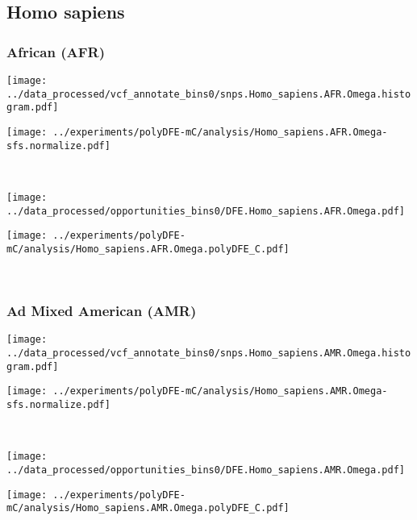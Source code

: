 \subsection{Homo sapiens}

\subsubsection{African (AFR)}

\begin{minipage}{0.49\linewidth}
    \texttt{[image: ../data\_processed/vcf\_annotate\_bins0/snps.Homo\_sapiens.AFR.Omega.histogram.pdf]}
\end{minipage}
\begin{minipage}{0.49\linewidth}
    \texttt{[image: ../experiments/polyDFE-mC/analysis/Homo\_sapiens.AFR.Omega-sfs.normalize.pdf]}
\end{minipage}
\\
\begin{minipage}{0.49\linewidth}
    \texttt{[image: ../data\_processed/opportunities\_bins0/DFE.Homo\_sapiens.AFR.Omega.pdf]}
\end{minipage}
\begin{minipage}{0.49\linewidth}
    \texttt{[image: ../experiments/polyDFE-mC/analysis/Homo\_sapiens.AFR.Omega.polyDFE\_C.pdf]}
\end{minipage}
\\

\subsubsection{Ad Mixed American (AMR)}

\begin{minipage}{0.49\linewidth}
    \texttt{[image: ../data\_processed/vcf\_annotate\_bins0/snps.Homo\_sapiens.AMR.Omega.histogram.pdf]}
\end{minipage}
\begin{minipage}{0.49\linewidth}
    \texttt{[image: ../experiments/polyDFE-mC/analysis/Homo\_sapiens.AMR.Omega-sfs.normalize.pdf]}
\end{minipage}
\\
\begin{minipage}{0.49\linewidth}
    \texttt{[image: ../data\_processed/opportunities\_bins0/DFE.Homo\_sapiens.AMR.Omega.pdf]}
\end{minipage}
\begin{minipage}{0.49\linewidth}
    \texttt{[image: ../experiments/polyDFE-mC/analysis/Homo\_sapiens.AMR.Omega.polyDFE\_C.pdf]}
\end{minipage}
\\

